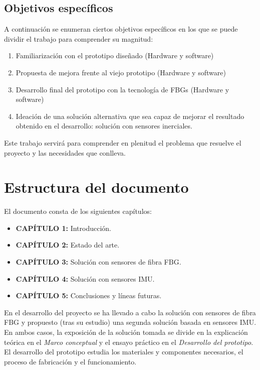 

\subsection{Objetivos específicos}
\label{sec:objEspec1}


A continuación se enumeran ciertos objetivos específicos en los que se puede dividir el trabajo para comprender su magnitud: 

\begin{enumerate}
	\item Familiarización con el prototipo diseñado (Hardware y software)
	\item Propuesta de mejora frente al viejo prototipo (Hardware y software)
	\item Desarrollo final del prototipo con la tecnología de FBGs (Hardware y software)
	\item Ideación de una solución alternativa que sea capaz de mejorar el resultado obtenido en el desarrollo: solución con sensores inerciales.
	
\end{enumerate}

Este trabajo servirá para comprender en plenitud el problema que resuelve el proyecto y las necesidades que conlleva.


\section{Estructura del documento}
\label{sec:disposicion1}

El documento consta de los siguientes capítulos: 

\begin{itemize}[label=]
	\item {\textbf{CAPÍTULO 1:} Introducción.}
	\item {\textbf{CAPÍTULO 2:} Estado del arte.}
	\item {\textbf{CAPÍTULO 3:} Solución con sensores de fibra FBG.}
	\item {\textbf{CAPÍTULO 4:} Solución con sensores IMU.}
	\item {\textbf{CAPÍTULO 5:} Conclusiones y líneas futuras.}
\end{itemize}


En el desarrollo del proyecto se ha llevado a cabo la solución con sensores de fibra FBG y propuesto (tras su estudio) una segunda solución basada en sensores IMU. En ambos casos, la exposición de la solución tomada se divide en la explicación teórica en el \textit{Marco conceptual} y el ensayo práctico en el \textit{Desarrollo del prototipo}. El desarrollo del prototipo estudia los materiales y componentes necesarios, el proceso de fabricación y el funcionamiento. 



